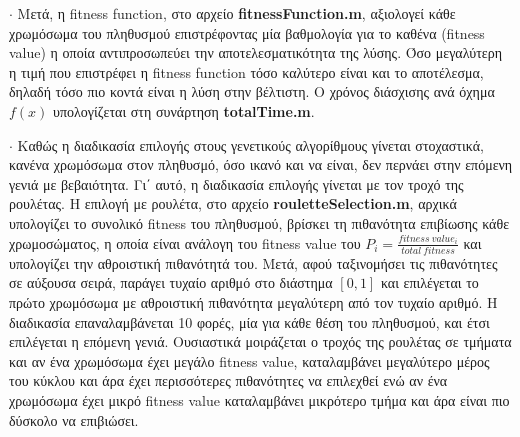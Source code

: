 \documentclass[11pt,a4paper,onecolumn,final]{article}
\begin{document}
{{{\begin{flushleft}
\vspace{0.4cm}

\(\cdot\) Μετά, η fitness function, στο αρχείο \textbf{fitnessFunction.m}, αξιολογεί κάθε χρωμόσωμα του πληθυσμού επιστρέφοντας μία βαθμολογία για το καθένα (fitness value) η οποία αντιπροσωπεύει την αποτελεσματικότητα της λύσης. Όσο μεγαλύτερη η τιμή που επιστρέφει η fitness function τόσο καλύτερο είναι και το αποτέλεσμα, δηλαδή τόσο πιο κοντά είναι η λύση στην βέλτιστη. Ο χρόνος διάσχισης ανά όχημα \(f(x)\) υπολογίζεται στη συνάρτηση \textbf{totalTime.m}.

\vspace{0.4cm}

\(\cdot\) Καθώς η διαδικασία επιλογής στους γενετικούς αλγορίθμους γίνεται στοχαστικά, κανένα χρωμόσωμα στον πληθυσμό, όσο ικανό και να είναι, δεν περνάει στην επόμενη γενιά με βεβαιότητα. Γι΄ αυτό, η διαδικασία επιλογής γίνεται με τον τροχό της ρουλέτας. Η επιλογή με ρουλέτα, στο αρχείο \textbf{rouletteSelection.m}, αρχικά υπολογίζει το συνολικό fitness του πληθυσμού, βρίσκει τη πιθανότητα επιβίωσης κάθε χρωμοσώματος, η οποία είναι ανάλογη του fitness value του \(P_{i}=\frac{fitness \: value_{i}}{total \: fitness}\) και υπολογίζει την αθροιστική πιθανότητά του. Μετά, αφού ταξινομήσει τις πιθανότητες σε αύξουσα σειρά, παράγει τυχαίο αριθμό στο διάστημα \([0, 1]\) και επιλέγεται το πρώτο χρωμόσωμα με αθροιστική πιθανότητα μεγαλύτερη από τον τυχαίο αριθμό. Η διαδικασία επαναλαμβάνεται 10 φορές, μία για κάθε θέση του πληθυσμού, και έτσι επιλέγεται η επόμενη γενιά. Ουσιαστικά μοιράζεται ο τροχός της ρουλέτας σε τμήματα και αν ένα χρωμόσωμα έχει μεγάλο fitness value, καταλαμβάνει μεγαλύτερο μέρος του κύκλου και άρα έχει περισσότερες πιθανότητες να επιλεχθεί ενώ αν ένα χρωμόσωμα έχει μικρό fitness value καταλαμβάνει μικρότερο τμήμα και άρα είναι πιο δύσκολο να επιβιώσει.

\vspace{0.4cm}     


\end{flushleft}}}}
\end{document}
